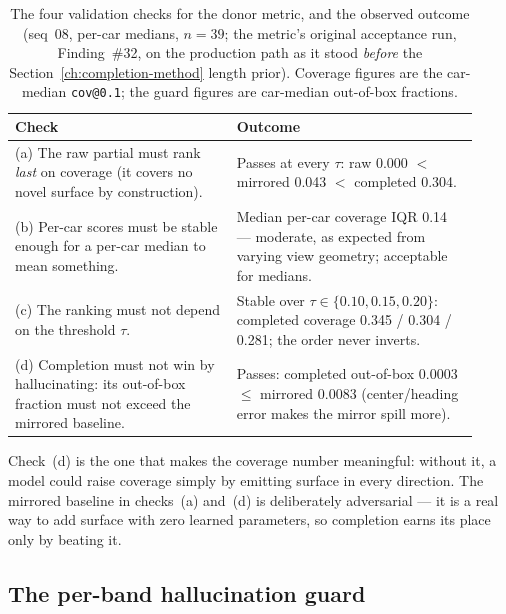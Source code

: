 \begin{table}[H]
  \centering
  \caption{The four validation checks for the donor metric, and the observed
    outcome (seq~08, per-car medians, $n=39$; the metric's original acceptance
    run, Finding~\#32, on the production path as it stood \emph{before} the
    Section~\ref{ch:completion-method} length prior). Coverage figures are the car-median
    \texttt{cov@0.1}; the guard figures are car-median out-of-box fractions.}
  \label{tab:donor-gate}
  \begin{tabular}{p{0.44\linewidth} p{0.48\linewidth}}
    \toprule
    Check & Outcome \\
    \midrule
    (a) The raw partial must rank \emph{last} on coverage (it covers no novel
      surface by construction). & Passes at every $\tau$: raw \num{0.000}
      $<$ mirrored \num{0.043} $<$ completed \num{0.304}. \\
    (b) Per-car scores must be stable enough for a per-car median to mean
      something. & Median per-car coverage IQR \num{0.14} --- moderate, as
      expected from varying view geometry; acceptable for medians. \\
    (c) The ranking must not depend on the threshold $\tau$. & Stable over
      $\tau \in \{0.10, 0.15, 0.20\}$: completed coverage
      \num{0.345} / \num{0.304} / \num{0.281}; the order never inverts. \\
    (d) Completion must not win by hallucinating: its out-of-box fraction must
      not exceed the mirrored baseline. & Passes: completed out-of-box
      \num{0.0003} $\leq$ mirrored \num{0.0083} (center/heading error makes the
      mirror spill more). \\
    \bottomrule
  \end{tabular}
\end{table}

Check~(d) is the one that makes the coverage number meaningful: without it, a
model could raise coverage simply by emitting surface in every direction. The
mirrored baseline in checks~(a) and~(d) is deliberately adversarial --- it is a
real way to add surface with zero learned parameters, so completion earns its
place only by beating it.

\subsection{The per-band hallucination guard}
\label{sec:donor-guard-lesson}

